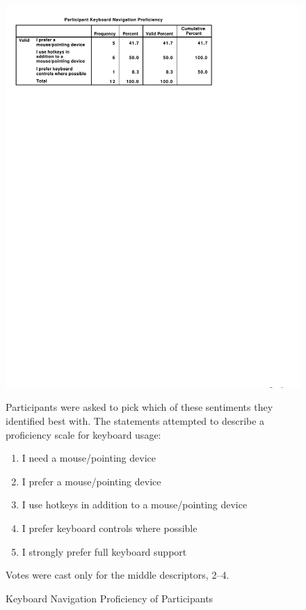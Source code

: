 \documentclass[a4paper, 12pt]{report}
\begin{document}
\begin{figure}[ht]
\centerline{\includegraphics{figures/Proficiency.pdf}}
\caption{Keyboard Navigation Proficiency of Participants}
\label{fig:partic_proficiency}
\medskip
\small
Participants were asked to pick which of these sentiments they identified best with. The statements attempted to describe a proficiency scale for keyboard usage:
\begin{enumerate}
\item I need a mouse/pointing device
\item I prefer a mouse/pointing device
\item I use hotkeys in addition to a mouse/pointing device
\item I prefer keyboard controls where possible
\item I strongly prefer full keyboard support
\end{enumerate}
Votes were cast only for the middle descriptors, 2--4.
\end{figure}
\end{document}

